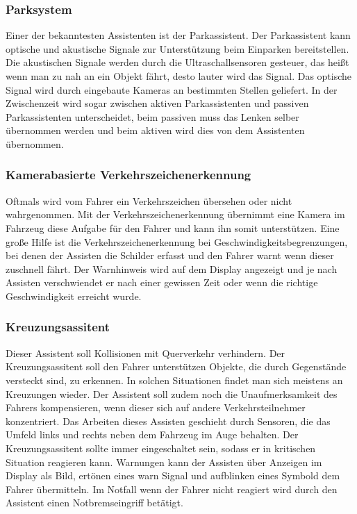         \subsubsection{Parksystem}
        Einer der bekanntesten Assistenten ist der Parkassistent. Der Parkassistent kann optische und 
        akustische Signale zur Unterstützung beim Einparken bereitstellen. Die akustischen Signale werden
        durch die Ultraschallsensoren gesteuer, das heißt wenn man zu nah an ein Objekt fährt, desto lauter 
        wird das Signal. Das optische Signal wird durch eingebaute Kameras an bestimmten Stellen geliefert.
        In der Zwischenzeit wird sogar zwischen aktiven Parkassistenten und passiven Parkassistenten 
        unterscheidet, beim passiven muss das Lenken selber übernommen werden und beim aktiven wird 
        dies von dem Assistenten übernommen.
        
        
        \subsubsection{Kamerabasierte Verkehrszeichenerkennung}
        Oftmals wird vom Fahrer ein Verkehrszeichen übersehen oder nicht wahrgenommen. Mit der Verkehrszeichenerkennung 
        übernimmt eine Kamera im Fahrzeug diese Aufgabe für den Fahrer und kann ihn somit unterstützen.
        Eine große Hilfe ist die Verkehrszeichenerkennung bei Geschwindigkeitsbegrenzungen, bei denen der 
        Assisten die Schilder erfasst und den Fahrer warnt wenn dieser zuschnell fährt. Der Warnhinweis 
        wird auf dem Display angezeigt und je nach Assisten verschwiendet er nach einer gewissen Zeit oder 
        wenn die richtige Geschwindigkeit erreicht wurde.
        
        \subsubsection{Kreuzungsassitent}
        Dieser Assistent soll Kollisionen mit Querverkehr verhindern. Der Kreuzungsassitent soll den Fahrer 
        unterstützen Objekte, die durch Gegenstände versteckt sind, zu erkennen. In solchen Situationen findet 
        man sich meistens an Kreuzungen wieder. Der Assistent soll zudem noch die Unaufmerksamkeit des 
        Fahrers kompensieren, wenn dieser sich auf andere Verkehrsteilnehmer konzentriert. Das Arbeiten  
        dieses Assisten geschieht durch Sensoren, die das Umfeld links und rechts neben dem Fahrzeug  im 
        Auge behalten. Der Kreuzungsassitent sollte immer eingeschaltet sein, sodass er in kritischen Situation 
        reagieren kann. Warnungen kann der Assisten über Anzeigen im Display als Bild, ertönen eines warn 
        Signal und aufblinken eines Symbold dem Fahrer übermitteln. Im Notfall wenn der Fahrer nicht 
        reagiert wird durch den Assistent einen Notbremseingriff betätigt.